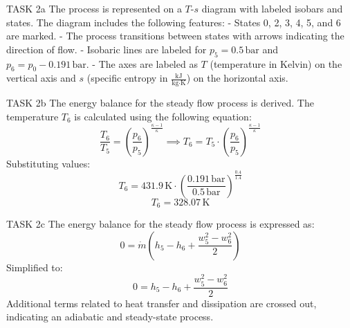 TASK 2a  
The process is represented on a \( T \)-\( s \) diagram with labeled isobars and states. The diagram includes the following features:  
- States 0, 2, 3, 4, 5, and 6 are marked.  
- The process transitions between states with arrows indicating the direction of flow.  
- Isobaric lines are labeled for \( p_5 = 0.5 \, \text{bar} \) and \( p_6 = p_0 - 0.191 \, \text{bar} \).  
- The axes are labeled as \( T \) (temperature in Kelvin) on the vertical axis and \( s \) (specific entropy in \( \frac{\text{kJ}}{\text{kg·K}} \)) on the horizontal axis.  

TASK 2b  
The energy balance for the steady flow process is derived. The temperature \( T_6 \) is calculated using the following equation:  
\[
\frac{T_6}{T_5} = \left( \frac{p_6}{p_5} \right)^{\frac{\kappa - 1}{\kappa}} \implies T_6 = T_5 \cdot \left( \frac{p_6}{p_5} \right)^{\frac{\kappa - 1}{\kappa}}
\]  
Substituting values:  
\[
T_6 = 431.9 \, \text{K} \cdot \left( \frac{0.191 \, \text{bar}}{0.5 \, \text{bar}} \right)^{\frac{0.4}{1.4}}
\]  
\[
T_6 = 328.07 \, \text{K}
\]  

TASK 2c  
The energy balance for the steady flow process is expressed as:  
\[
0 = \dot{m} \left( h_5 - h_6 + \frac{w_5^2 - w_6^2}{2} \right)
\]  
Simplified to:  
\[
0 = h_5 - h_6 + \frac{w_5^2 - w_6^2}{2}
\]  
Additional terms related to heat transfer and dissipation are crossed out, indicating an adiabatic and steady-state process.